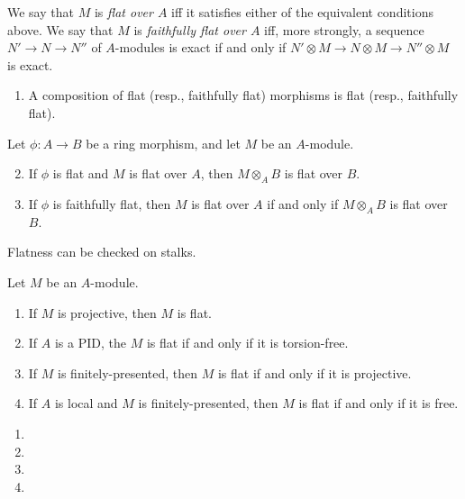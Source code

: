 \documentclass[10pt,final,oneside]{amsbook}
\makeatletter
\renewenvironment{proof}[1][\proofname] 
{ 	
	\par\pushQED{\qed}\normalfont\topsep6\p@\@plus6\p@\relax\trivlist\itemindent\normalparindent
	\item[\hskip\labelsep\itshape#1\@addpunct{.}]\ignorespaces
}
{
	\popQED\endtrivlist\@endpefalse
}
\numberwithin{equation}{section}
\makeatother
\begin{document}
We say that $M$ is \emph{flat over $A$} iff it satisfies either of the equivalent conditions above.
We say that $M$ is \emph{faithfully flat over $A$} iff, more strongly, a sequence $N' \to N \to N''$ of $A$-modules is exact if and only if $N' \otimes M \to N \otimes M \to N'' \otimes M$ is exact.

\begin{prop}\mbox{}
\begin{enumerate}
\item 	A composition of flat (resp., faithfully flat) morphisms is flat (resp., faithfully flat).
\end{enumerate}
Let $\phi : A \to B$ be a ring morphism, and let $M$ be an $A$-module.
\begin{enumerate}\setcounter{enumi}{1}
\item 	If $\phi$ is flat and $M$ is flat over $A$, then $M \otimes_A B$ is flat over $B$.
\item 	If $\phi$ is faithfully flat, then $M$ is flat over $A$ if and only if $M \otimes_A B$ is flat over $B$.
\end{enumerate}
\end{prop}

\begin{prop}
Flatness can be checked on stalks.
\end{prop}

\begin{prop}
Let $M$ be an $A$-module.
\begin{enumerate}
\item 	If $M$ is projective, then $M$ is flat.
\item 	If $A$ is a PID, the $M$ is flat if and only if it is torsion-free.
\item 	If $M$ is finitely-presented, then $M$ is flat if and only if it is projective.
\item 	If $A$ is local and $M$ is finitely-presented, then $M$ is flat if and only if it is free.
\end{enumerate}
\end{prop}

\begin{proof}\mbox{}
\begin{enumerate}
\item 	
\item 	
\item 	
\item 	\qedhere
\end{enumerate}
\end{proof}
\end{document}

